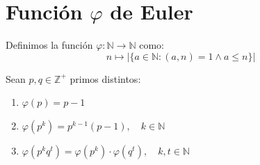 \section{\texorpdfstring{Función $\varphi$ de Euler}{Función phi de Euler}}%
\label{sec:Función phi de Euler}

\begin{defi}
	Definimos la función $\varphi: \mathbb{N} \to \mathbb{N}$ como:
	\begin{equation*}
		n \mapsto |\{a \in \mathbb{N} : (a, n) = 1 \land a \le n\}|
	\end{equation*}
\end{defi}

\begin{prop}
	Sean $p, q \in \mathbb{Z} ^ {+}$ primos distintos:
	\begin{enumerate}[label=\roman *), font=\normalfont]
		\item $\varphi(p) = p-1$
		\item $\varphi(p^k) = p^{k-1}(p-1), \quad k \in \mathbb{N}$
		\item $\varphi(p^k q^t) = \varphi(p^k) \cdot \varphi(q^t), \quad k,t \in \mathbb{N}$
	\end{enumerate}
\end{prop}

